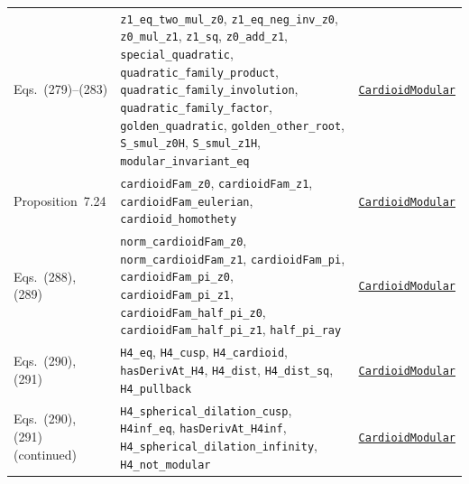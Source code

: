 \documentclass[11pt,a4paper]{article}
\newcommand{\R}{https://github.com/ralfanop/Certifications_Eulerian_polar-curve_computations}
\newcommand{\A}{\R/blob/main/certifications/manuscript15}
\begin{document}
{\begin{longtable}{@{}>{\raggedright\arraybackslash}p{}>{\raggedright\arraybackslash}p{}>{\raggedright\arraybackslash}p{}@{}}
Eqs.~(279)--(283) & \texttt{z1\_\allowbreak eq\_\allowbreak two\_\allowbreak mul\_\allowbreak z0}, \texttt{z1\_\allowbreak eq\_\allowbreak neg\_\allowbreak inv\_\allowbreak z0}, \texttt{z0\_\allowbreak mul\_\allowbreak z1}, \texttt{z1\_\allowbreak sq}, \texttt{z0\_\allowbreak add\_\allowbreak z1}, \texttt{special\_\allowbreak quadratic}, \texttt{quadratic\_\allowbreak family\_\allowbreak product}, \texttt{quadratic\_\allowbreak family\_\allowbreak involution}, \texttt{quadratic\_\allowbreak family\_\allowbreak factor}, \texttt{golden\_\allowbreak quadratic}, \texttt{golden\_\allowbreak other\_\allowbreak root}, \texttt{S\_\allowbreak smul\_\allowbreak z0H}, \texttt{S\_\allowbreak smul\_\allowbreak z1H}, \texttt{modular\_\allowbreak invariant\_\allowbreak eq} & \href{\A/LEAN/PrivateApex/CardioidModular.lean}{\texttt{CardioidModular}}\\
Proposition~7.24 & \texttt{cardioidFam\_\allowbreak z0}, \texttt{cardioidFam\_\allowbreak z1}, \texttt{cardioidFam\_\allowbreak eulerian}, \texttt{cardioid\_\allowbreak homothety} & \href{\A/LEAN/PrivateApex/CardioidModular.lean}{\texttt{CardioidModular}}\\
Eqs.~(288), (289) & \texttt{norm\_\allowbreak cardioidFam\_\allowbreak z0}, \texttt{norm\_\allowbreak cardioidFam\_\allowbreak z1}, \texttt{cardioidFam\_\allowbreak pi}, \texttt{cardioidFam\_\allowbreak pi\_\allowbreak z0}, \texttt{cardioidFam\_\allowbreak pi\_\allowbreak z1}, \texttt{cardioidFam\_\allowbreak half\_\allowbreak pi\_\allowbreak z0}, \texttt{cardioidFam\_\allowbreak half\_\allowbreak pi\_\allowbreak z1}, \texttt{half\_\allowbreak pi\_\allowbreak ray} & \href{\A/LEAN/PrivateApex/CardioidModular.lean}{\texttt{CardioidModular}}\\
Eqs.~(290), (291) & \texttt{H4\_\allowbreak eq}, \texttt{H4\_\allowbreak cusp}, \texttt{H4\_\allowbreak cardioid}, \texttt{hasDerivAt\_\allowbreak H4}, \texttt{H4\_\allowbreak dist}, \texttt{H4\_\allowbreak dist\_\allowbreak sq}, \texttt{H4\_\allowbreak pullback} & \href{\A/LEAN/PrivateApex/CardioidModular.lean}{\texttt{CardioidModular}}\\
Eqs.~(290), (291) (continued) & \texttt{H4\_\allowbreak spherical\_\allowbreak dilation\_\allowbreak cusp}, \texttt{H4inf\_\allowbreak eq}, \texttt{hasDerivAt\_\allowbreak H4inf}, \texttt{H4\_\allowbreak spherical\_\allowbreak dilation\_\allowbreak infinity}, \texttt{H4\_\allowbreak not\_\allowbreak modular} & \href{\A/LEAN/PrivateApex/CardioidModular.lean}{\texttt{CardioidModular}}\\
\end{longtable}}
\end{document}
